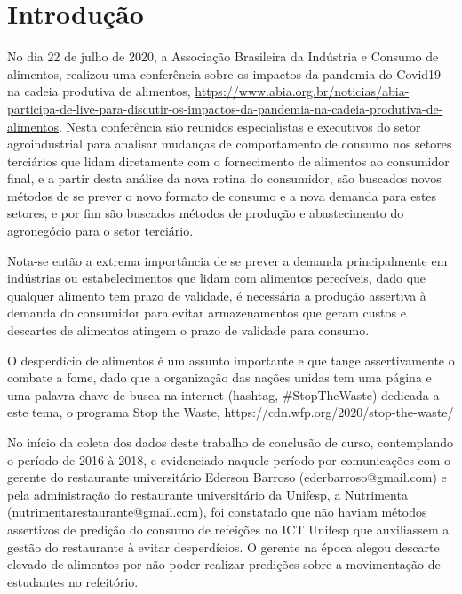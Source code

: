 \chapter{Introdução}


\noindent
{}
No dia 22 de julho de 2020, a Associação Brasileira da Indústria e Consumo de alimentos, realizou uma conferência sobre os impactos da pandemia do Covid19 na cadeia produtiva de alimentos, \url{https://www.abia.org.br/noticias/abia-participa-de-live-para-discutir-os-impactos-da-pandemia-na-cadeia-produtiva-de-alimentos}. Nesta conferência são reunidos especialistas e executivos do setor agroindustrial para analisar mudanças de comportamento de consumo nos setores terciários que lidam diretamente com o fornecimento de alimentos ao consumidor final, e a partir desta análise da nova rotina do consumidor, são buscados novos métodos de se prever o novo formato de consumo e a nova demanda para estes setores, e por fim são buscados métodos de produção e abastecimento do agronegócio para o setor terciário.

Nota-se então a extrema importância de se prever a demanda principalmente em indústrias ou estabelecimentos que lidam com alimentos perecíveis, dado que qualquer alimento tem prazo de validade, é necessária a produção assertiva à demanda do consumidor para evitar armazenamentos que geram custos e descartes de alimentos atingem o prazo de validade para consumo.

O desperdício de alimentos é um assunto importante e que tange assertivamente o combate a fome, dado que a organização das nações unidas tem uma página e uma palavra chave de busca na internet (hashtag, \#StopTheWaste) dedicada a este tema, o programa Stop the Waste, https://cdn.wfp.org/2020/stop-the-waste/

No início da coleta dos dados deste trabalho de conclusão de curso, contemplando o período de 2016 à 2018, e evidenciado naquele período por comunicações com o gerente do restaurante universitário Ederson Barroso (ederbarroso@gmail.com) e pela administração do restaurante universitário da Unifesp, a Nutrimenta (nutrimentarestaurante@gmail.com), foi constatado que não haviam métodos assertivos de predição do consumo de refeições no ICT Unifesp que auxiliassem a gestão do restaurante à evitar desperdícios. O gerente na época alegou descarte elevado de alimentos por não poder realizar predições sobre a movimentação de estudantes no refeitório.

